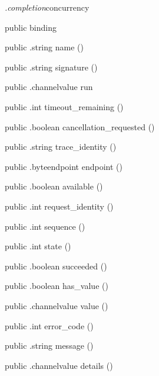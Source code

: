 \begin{CrexxClass}{\textit{.completion}}{concurrency}
\begin{Members}
    \Factory
      {public}
      {binding}
      {}

    \Method
      {public}
      {.string}
      {name}
      {()}

    \Method
      {public}
      {.string}
      {signature}
      {()}

    \Method
      {public}
      {.channelvalue}
      {run}
      {}

    \Method
      {public}
      {.int}
      {timeout\_remaining}
      {()}

    \Method
      {public}
      {.boolean}
      {cancellation\_requested}
      {()}

    \Method
      {public}
      {.string}
      {trace\_identity}
      {()}

    \Method
      {public}
      {.byteendpoint}
      {endpoint}
      {()}

    \Method
      {public}
      {.boolean}
      {available}
      {()}

    \Method
      {public}
      {.int}
      {request\_identity}
      {()}

    \Method
      {public}
      {.int}
      {sequence}
      {()}

    \Method
      {public}
      {.int}
      {state}
      {()}

    \Method
      {public}
      {.boolean}
      {succeeded}
      {()}

    \Method
      {public}
      {.boolean}
      {has\_value}
      {()}

    \Method
      {public}
      {.channelvalue}
      {value}
      {()}

    \Method
      {public}
      {.int}
      {error\_code}
      {()}

    \Method
      {public}
      {.string}
      {message}
      {()}

    \Method
      {public}
      {.channelvalue}
      {details}
      {()}

  \end{Members}
\end{CrexxClass}

